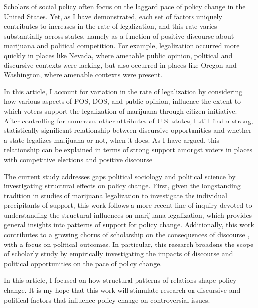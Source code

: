 Scholars of social policy often focus on the laggard pace of policy change in the United States. 
Yet, as I have demonstrated, each set of factors uniquely contributes to increases in the rate of legalization, and this rate varies substantially across states, namely as a function of positive discourse about marijuana and political competition. For example, legalization occurred more quickly in places like Nevada, where amenable public opinion, political and discursive contexts were lacking, but also occurred in places like Oregon and Washington, where amenable contexts were present. %

In this article, I account for variation in the rate of legalization by considering how various aspects of POS, DOS, and public opinion, influence the extent to which voters support the legalization of marijuana through citizen initiative. After controlling for numerous other attributes of U.S. states, I still find a strong, statistically significant relationship between discursive opportunities and whether a state legalizes marijuana or not, when it does. As I have argued, this relationship can be explained in terms of strong support amongst voters in places with competitive elections and positive discourse

The current study addresses gaps political sociology and political science by investigating  structural effects on policy change. First, given the longstanding tradition in studies of marijuana legalization to investigate the individual precipitants of support, this work follows a more recent line of inquiry devoted to understanding the structural influences on marijuana legalization, which provides general insights into patterns of support for policy change. Additionally, this work contributes to a growing chorus of scholarship on the consequences of discourse \citep{bail_2012,vasi_et_al_2015}, with a focus on political outcomes. In particular, this research broadens the scope of scholarly study by empirically investigating the impacts of discourse and political opportunities on the pace of policy change. 

In this article, I focused on how structural patterns of relations shape policy change. It is my hope that this work will stimulate research on discursive and political factors that influence policy change on controversial issues.



